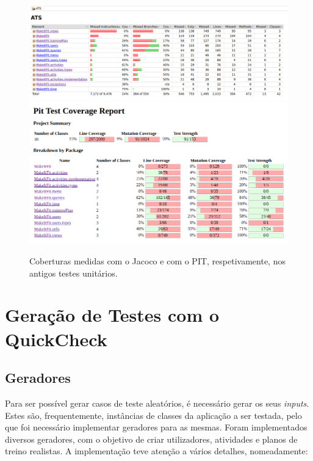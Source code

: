 \documentclass[12pt, a4paper]{article}
\begin{document}
\begin{figure}[H]
    \includegraphics[width=\textwidth]{res/OldJacoco.png}
    \includegraphics[width=\textwidth]{res/OldPit.png}
    \caption{Coberturas medidas com o Jacoco e com o PIT, respetivamente, nos antigos testes unitários.}
\end{figure}

\section{Geração de Testes com o QuickCheck}

\subsection{Geradores}

Para ser possível gerar casos de teste aleatórios, é necessário gerar os seus \emph{inputs}. Estes
são, frequentemente, instâncias de classes da aplicação a ser testada, pelo que foi necessário
implementar geradores para as mesmas. Foram implementados diversos geradores, com o objetivo
de criar utilizadores, atividades e planos de treino realistas. A implementação teve atenção a
vários detalhes, nomeadamente:
\end{document}
